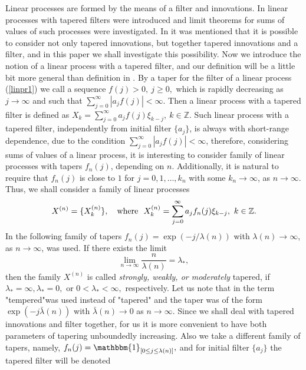 \documentclass[12pt]{article}
\def\bbr{{\mathbb R}}
\def\bz{{\bf Z}}
\def\bz{{\mathbb Z}} %
\def\l{\lambda}
\newcommand{\NN}{\mathbb{N} }
\newcommand{\ind}[1]{\mathbbm{1}_{#1}}
\theoremstyle{plain}
\theoremstyle{definition}
\begin{document}
Linear processes are formed by the means of a filter and innovations. In \cite{Sabzikar} linear processes with tapered filters were introduced and limit theorems  for sums of values of such processes
were investigated.
In \cite{Paul21} it was mentioned that it is possible to consider not only tapered innovations, but together  tapered innovations and a filter, and in this paper we shall investigate this possibility. Now we introduce the notion of a linear process with a tapered filter, and our definition will be a little bit more general than definition in \cite{Sabzikar}. By a  taper for the filter of a linear process (\ref{linpr1}) we call a sequence $f(j)>0, \ j\ge 0,$ which is rapidly
decreasing as $j\to \infty$ and such that $\sum_{j=0}^\infty |a_jf(j)|<\infty$.
  Then a linear process with a tapered filter is defined as $X_k=\sum_{j=0}^\infty a_jf(j)\xi_{k-j}, \ k\in \bz.$
Such linear process with a tapered filter, independently from initial filter $\{a_j\}$, is always with short-range dependence, due to the condition  $\sum_{j=0}^\infty |a_jf(j)|<\infty$, therefore, considering sums of values of a linear process, it is interesting to consider family of linear processes with tapers $f_n(j)$, depending on $n$. Additionally, it is natural to require that $f_n(j)$ is close to $1$ for $j=0, 1, \dots, k_n$ with some  $k_n \to \infty$, as
 $n\to \infty$.
Thus, we shall consider a family of linear processes
\begin{equation}\label{trunkfil}
X^{(n)}=\{X_k^{(n)} \}, \quad {\rm where} \ \  X_k^{(n)}=\sum_{j=0}^\infty a_jf_n(j)\xi_{k-j}, \ k\in \bz.
\end{equation}
In \cite{Sabzikar} the following family of tapers $f_n(j)=\exp (-j/\l(n))$ with $\l(n)\to \infty$, as $n\to \infty$, was used. If there exists the limit
$$
\lim_{n\to \infty}\frac{n}{\l(n)}=\l_*,
$$
 then the family $X^{(n)}$ is  called {\it strongly, weakly, or moderately} tapered, if $\l_*=\infty, \l_*=0,$ or $0<\l_*<\infty,$ respectively. Let us note that in \cite{Sabzikar} the term "tempered"was used instead of "tapered" and the taper was of the form $\exp (-j{\bar \l}(n))$ with ${\bar \l}(n)\to 0$ as $n\to \infty$. Since we shall deal with tapered innovations and filter together, for us it is more convenient to have both parameters of tapering unboundedly increasing. Also we  take a  different family of tapers, namely, $f_n(j)=\ind{[0\le j\le \l(n)]},$ and for initial filter $\{a_j\}$ the  tapered filter will be denoted
\end{document}
